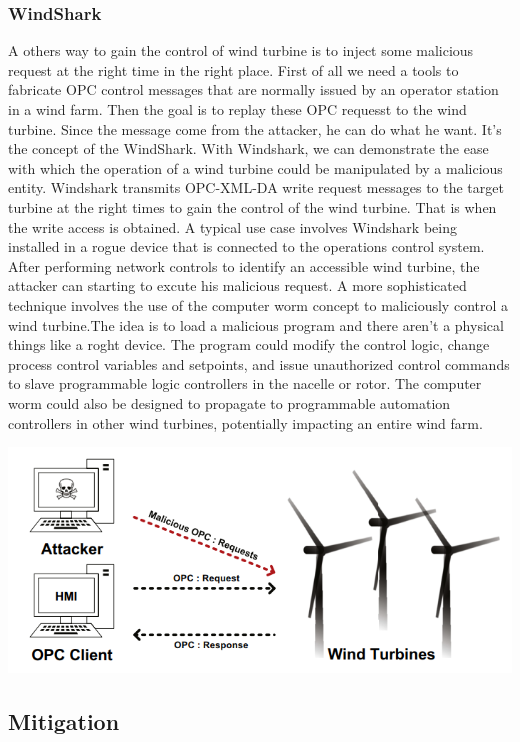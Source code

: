 \documentclass[twosided,a4,10pt]{article}
\begin{document}
\begin{multicols}{2}
\subsubsection{WindShark}
A others way to gain the control of wind turbine is to inject some malicious request at the right time in the right place. First of all we need a tools to fabricate OPC control messages that are normally issued by an operator station in a wind farm. Then the goal is to replay these OPC requesst to the wind turbine. Since the message come from the attacker, he can do what he want. It's the concept of the WindShark. With Windshark, we can demonstrate the ease with which the operation of a wind turbine could be manipulated by a malicious entity. Windshark transmits OPC-XML-DA write request messages to the target turbine at the right times to gain the control of the wind turbine. That is when the write access is obtained. \newline
A typical use case involves Windshark being installed in a rogue device that is connected to the operations control system. After performing network controls to identify an accessible wind turbine, the attacker can starting to excute his malicious request. A more sophisticated technique involves the use of the computer worm concept to maliciously control a wind turbine.The idea is to load a malicious program and there aren't a physical things like a roght device. The program could modify the control logic, change process control variables and setpoints, and issue unauthorized control commands to slave programmable logic controllers in the nacelle or rotor. The computer worm could also be designed to propagate to programmable automation controllers in other wind turbines, potentially impacting an entire wind farm.


\includegraphics[scale=0.5]{Windshark}

	
\subsection{Mitigation}


\end{multicols}
\end{document}
